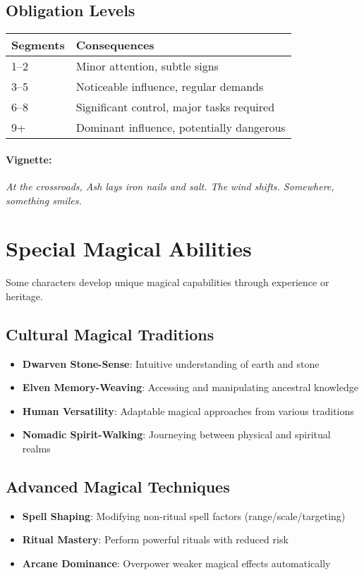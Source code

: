 \subsection*{Obligation Levels}
\begin{center}
\small
\begin{tabular}{ll}
\toprule
\textbf{Segments} & \textbf{Consequences} \\
\midrule
1--2 & Minor attention, subtle signs \\
3--5 & Noticeable influence, regular demands \\
6--8 & Significant control, major tasks required \\
9+   & Dominant influence, potentially dangerous \\
\bottomrule
\end{tabular}
\end{center}

\paragraph{Vignette:}
\emph{At the crossroads, Ash lays iron nails and salt. The wind shifts. Somewhere, something smiles.}

\section{Special Magical Abilities} 

Some characters develop unique magical capabilities through experience or heritage.

\subsection*{Cultural Magical Traditions}
\begin{itemize}
\item \textbf{Dwarven Stone-Sense}: Intuitive understanding of earth and stone
\item \textbf{Elven Memory-Weaving}: Accessing and manipulating ancestral knowledge
\item \textbf{Human Versatility}: Adaptable magical approaches from various traditions
\item \textbf{Nomadic Spirit-Walking}: Journeying between physical and spiritual realms
\end{itemize}

\subsection*{Advanced Magical Techniques}
\begin{itemize}
\item \textbf{Spell Shaping}: Modifying non-ritual spell factors (range/scale/targeting)
\item \textbf{Ritual Mastery}: Perform powerful rituals with reduced risk
\item \textbf{Arcane Dominance}: Overpower weaker magical effects automatically
\end{itemize}

